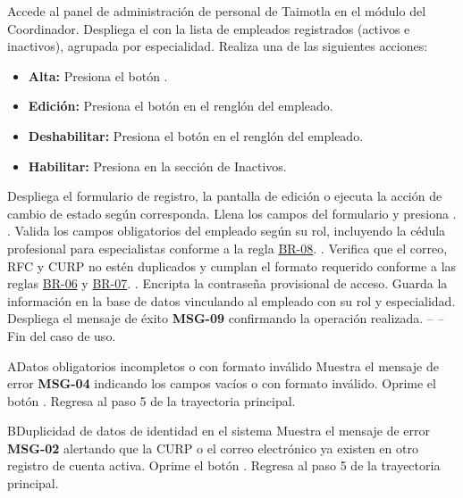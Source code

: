 \begin{UCtrayectoria}
	\UCpaso[\UCactor] Accede al panel de administración de personal de Taimotla en el módulo del Coordinador.
	\UCpaso Despliega el  con la lista de empleados registrados (activos e inactivos), agrupada por especialidad.
	\UCpaso[\UCactor] Realiza una de las siguientes acciones:
		\begin{itemize}
			\item \textbf{Alta:} Presiona el botón .
			\item \textbf{Edición:} Presiona el botón  en el renglón del empleado.
			\item \textbf{Deshabilitar:} Presiona el botón  en el renglón del empleado.
			\item \textbf{Habilitar:} Presiona  en la sección de Inactivos.
		\end{itemize}
	\UCpaso Despliega el formulario de registro, la pantalla de edición o ejecuta la acción de cambio de estado según corresponda.
	\UCpaso[\UCactor] Llena los campos del formulario y presiona . .
	\UCpaso Valida los campos obligatorios del empleado según su rol, incluyendo la cédula profesional para especialistas conforme a la regla \hyperlink{BR-08}{BR-08}. .
	\UCpaso Verifica que el correo, RFC y CURP no estén duplicados y cumplan el formato requerido conforme a las reglas \hyperlink{BR-06}{BR-06} y \hyperlink{BR-07}{BR-07}. .
	\UCpaso Encripta la contraseña provisional de acceso.
	\UCpaso Guarda la información en la base de datos vinculando al empleado con su rol y especialidad.
	\UCpaso Despliega el mensaje de éxito {\bf MSG-09} confirmando la operación realizada.
	\UCpaso[] -- -- Fin del caso de uso.
\end{UCtrayectoria}

\begin{UCtrayectoriaA}{A}{Datos obligatorios incompletos o con formato inválido}
	\UCpaso Muestra el mensaje de error {\bf MSG-04} indicando los campos vacíos o con formato inválido.
	\UCpaso[\UCactor] Oprime el botón .
	\UCpaso Regresa al paso 5 de la trayectoria principal.
\end{UCtrayectoriaA}

\begin{UCtrayectoriaA}{B}{Duplicidad de datos de identidad en el sistema}
	\UCpaso Muestra el mensaje de error {\bf MSG-02} alertando que la CURP o el correo electrónico ya existen en otro registro de cuenta activa.
	\UCpaso[\UCactor] Oprime el botón .
	\UCpaso Regresa al paso 5 de la trayectoria principal.
\end{UCtrayectoriaA}
